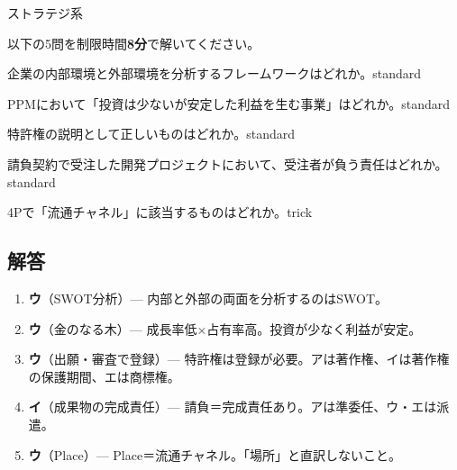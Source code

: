 \begin{minimoshi}{ストラテジ系}

以下の5問を制限時間\textbf{8分}で解いてください。

\begin{mondai}{企業の内部環境と外部環境を分析するフレームワークはどれか。}{standard}
\end{mondai}

\begin{mondai}{PPMにおいて「投資は少ないが安定した利益を生む事業」はどれか。}{standard}
\end{mondai}

\begin{mondai}{特許権の説明として正しいものはどれか。}{standard}
\end{mondai}

\begin{mondai}{請負契約で受注した開発プロジェクトにおいて、受注者が負う責任はどれか。}{standard}
\end{mondai}

\begin{mondai}{4Pで「流通チャネル」に該当するものはどれか。}{trick}
\end{mondai}

\end{minimoshi}

\subsection*{解答}

\begin{enumerate}
  \item \textbf{ウ}（SWOT分析）— 内部と外部の両面を分析するのはSWOT。
  \item \textbf{ウ}（金のなる木）— 成長率低×占有率高。投資が少なく利益が安定。
  \item \textbf{ウ}（出願・審査で登録）— 特許権は登録が必要。アは著作権、イは著作権の保護期間、エは商標権。
  \item \textbf{イ}（成果物の完成責任）— 請負＝完成責任あり。アは準委任、ウ・エは派遣。
  \item \textbf{ウ}（Place）— Place＝流通チャネル。「場所」と直訳しないこと。
\end{enumerate}

